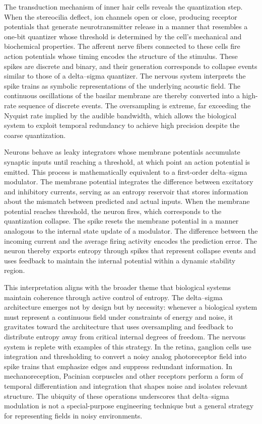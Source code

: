 The transduction mechanism of inner hair cells reveals the quantization step. When the stereocilia deflect, ion channels open or close, producing receptor potentials that generate neurotransmitter release in a manner that resembles a one-bit quantizer whose threshold is determined by the cell's mechanical and biochemical properties. The afferent nerve fibers connected to these cells fire action potentials whose timing encodes the structure of the stimulus. These spikes are discrete and binary, and their generation corresponds to collapse events similar to those of a delta–sigma quantizer. The nervous system interprets the spike trains as symbolic representations of the underlying acoustic field. The continuous oscillations of the basilar membrane are thereby converted into a high-rate sequence of discrete events. The oversampling is extreme, far exceeding the Nyquist rate implied by the audible bandwidth, which allows the biological system to exploit temporal redundancy to achieve high precision despite the coarse quantization.

Neurons behave as leaky integrators whose membrane potentials accumulate synaptic inputs until reaching a threshold, at which point an action potential is emitted. This process is mathematically equivalent to a first-order delta–sigma modulator. The membrane potential integrates the difference between excitatory and inhibitory currents, serving as an entropy reservoir that stores information about the mismatch between predicted and actual inputs. When the membrane potential reaches threshold, the neuron fires, which corresponds to the quantization collapse. The spike resets the membrane potential in a manner analogous to the internal state update of a modulator. The difference between the incoming current and the average firing activity encodes the prediction error. The neuron thereby exports entropy through spikes that represent collapse events and uses feedback to maintain the internal potential within a dynamic stability region.

This interpretation aligns with the broader theme that biological systems maintain coherence through active control of entropy. The delta–sigma architecture emerges not by design but by necessity: whenever a biological system must represent a continuous field under constraints of energy and noise, it gravitates toward the architecture that uses oversampling and feedback to distribute entropy away from critical internal degrees of freedom. The nervous system is replete with examples of this strategy. In the retina, ganglion cells use integration and thresholding to convert a noisy analog photoreceptor field into spike trains that emphasize edges and suppress redundant information. In mechanoreception, Pacinian corpuscles and other receptors perform a form of temporal differentiation and integration that shapes noise and isolates relevant structure. The ubiquity of these operations underscores that delta–sigma modulation is not a special-purpose engineering technique but a general strategy for representing fields in noisy environments.

